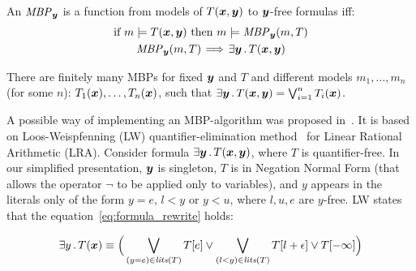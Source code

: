 \begin{definition}
\label{def:mbp}
An $\mathit{MBP}_{\vy}$ is a function from models of
$T(\vx,\vy)$ to $\vy$-free formulas
iff:
\begin{gather}
\text{if }m\models T(\vx,\vy) \text{ then } m\models \mathit{MBP}_{\vy}(m,T) \label{mbp.cond1}\\
\mathit{MBP}_{\vy}(m,T) \!\implies\! \exists \vy \such T(\vx,\vy) \label{mbp.cond2}
\end{gather}
\end{definition}

There are finitely many MBPs for fixed  $\vy$ and $T$ and different models $m_1,\ldots,m_n$ (for some $n$):
$T_{1}(\vx),  \ldots, T_{n}(\vx)$, such that
$\exists \vy \such T(\vx,\vy) = \Lor_{i=1}^{n} T_{i}(\vx)$. 

A possible way of implementing an MBP-algorithm was proposed in~\cite{komuravelli2014smt}.
It is based on Loos-Weispfenning (LW)  quantifier-elimination method~\cite{loos1993applying} for Linear Rational Arithmetic (LRA).
Consider formula $\exists \vy \such T(\vx,\vy)$, where $T$ is quantifier-free.
In our simplified presentation,
$\vy$ is singleton, $T$ is in Negation Normal Form (that allows the operator $\neg$ to be applied only to variables), and $y$ appears in the literals only of the form ${y=e}$, ${l<y}$ or ${y<u}$, where $l,u,e$ are $y$-free.
LW states that the equation~\eqref{eq:formula_rewrite} holds:

\begin{equation}
  \exists y \such T (\vx) \equiv \Big( \Lor_{(y = e) \in \mathit{lits}(T)}{T[e]} \lor
  	\Lor_{(l < y) \in \mathit{lits} (T)}{T [l + \epsilon]} \lor
	T[-\infty] \Big)\label{eq:formula_rewrite}
\end{equation} 
\smallskip  

